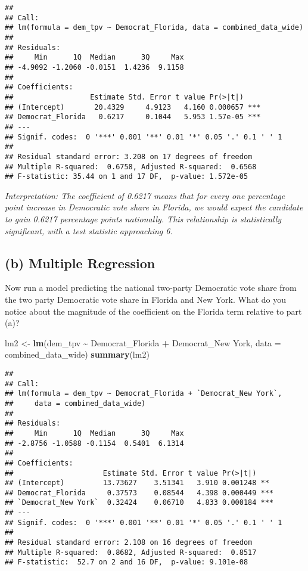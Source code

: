 \documentclass[
]{article}
\newenvironment{Shaded}{\begin{snugshade}}{\end{snugshade}}
\newcommand{\AttributeTok}[1]{\textcolor[rgb]{0.13,0.29,0.53}{#1}}
\newcommand{\FunctionTok}[1]{\textcolor[rgb]{0.13,0.29,0.53}{\textbf{#1}}}
\newcommand{\NormalTok}[1]{#1}
\newcommand{\OtherTok}[1]{\textcolor[rgb]{0.56,0.35,0.01}{#1}}
\newcommand{\SpecialCharTok}[1]{\textcolor[rgb]{0.81,0.36,0.00}{\textbf{#1}}}
\newcommand{\StringTok}[1]{\textcolor[rgb]{0.31,0.60,0.02}{#1}}
\begin{document}
\begin{verbatim}
## 
## Call:
## lm(formula = dem_tpv ~ Democrat_Florida, data = combined_data_wide)
## 
## Residuals:
##     Min      1Q  Median      3Q     Max 
## -4.9092 -1.2060 -0.0151  1.4236  9.1158 
## 
## Coefficients:
##                  Estimate Std. Error t value Pr(>|t|)    
## (Intercept)       20.4329     4.9123   4.160 0.000657 ***
## Democrat_Florida   0.6217     0.1044   5.953 1.57e-05 ***
## ---
## Signif. codes:  0 '***' 0.001 '**' 0.01 '*' 0.05 '.' 0.1 ' ' 1
## 
## Residual standard error: 3.208 on 17 degrees of freedom
## Multiple R-squared:  0.6758, Adjusted R-squared:  0.6568 
## F-statistic: 35.44 on 1 and 17 DF,  p-value: 1.572e-05
\end{verbatim}

\emph{Interpretation: The coefficient of 0.6217 means that for every one
percentage point increase in Democratic vote share in Florida, we would
expect the candidate to gain 0.6217 percentage points nationally. This
relationship is statistically significant, with a test statistic
approaching 6.}

\subsection{(b) Multiple Regression}\label{b-multiple-regression}

Now run a model predicting the national two-party Democratic vote share
from the two party Democratic vote share in Florida and New York. What
do you notice about the magnitude of the coefficient on the Florida term
relative to part (a)?

\begin{Shaded}
\begin{Highlighting}[]
\NormalTok{lm2 }\OtherTok{\textless{}{-}} \FunctionTok{lm}\NormalTok{(dem\_tpv }\SpecialCharTok{\textasciitilde{}}\NormalTok{ Democrat\_Florida }\SpecialCharTok{+} \StringTok{\textasciigrave{}}\AttributeTok{Democrat\_New York}\StringTok{\textasciigrave{}}\NormalTok{, }
           \AttributeTok{data =}\NormalTok{ combined\_data\_wide)}
\FunctionTok{summary}\NormalTok{(lm2)}
\end{Highlighting}
\end{Shaded}

\begin{verbatim}
## 
## Call:
## lm(formula = dem_tpv ~ Democrat_Florida + `Democrat_New York`, 
##     data = combined_data_wide)
## 
## Residuals:
##     Min      1Q  Median      3Q     Max 
## -2.8756 -1.0588 -0.1154  0.5401  6.1314 
## 
## Coefficients:
##                     Estimate Std. Error t value Pr(>|t|)    
## (Intercept)         13.73627    3.51341   3.910 0.001248 ** 
## Democrat_Florida     0.37573    0.08544   4.398 0.000449 ***
## `Democrat_New York`  0.32424    0.06710   4.833 0.000184 ***
## ---
## Signif. codes:  0 '***' 0.001 '**' 0.01 '*' 0.05 '.' 0.1 ' ' 1
## 
## Residual standard error: 2.108 on 16 degrees of freedom
## Multiple R-squared:  0.8682, Adjusted R-squared:  0.8517 
## F-statistic:  52.7 on 2 and 16 DF,  p-value: 9.101e-08
\end{verbatim}
\end{document}
